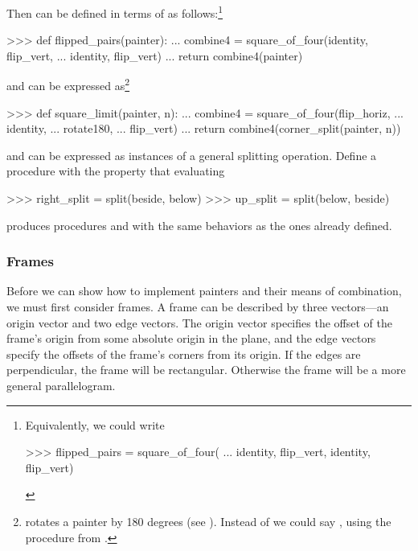 \noindent
Then  can be defined in terms of 
as follows:\footnote{Equivalently, we could write

\begin{compactCodeBlock}
>>> flipped_pairs = square_of_four(
...     identity, flip_vert, identity, flip_vert)
\end{compactCodeBlock}
}

\begin{codeBlock}
>>> def flipped_pairs(painter):
...     combine4 = square_of_four(identity, flip_vert,
...                               identity, flip_vert)
...     return combine4(painter)
\end{codeBlock}

\noindent
and  can be expressed as\footnote{ rotates
a painter by 180 degrees (see ).  Instead of
 we could say , using
the  procedure from .}

\begin{codeBlock}
>>> def square_limit(painter, n):
...     combine4 = square_of_four(flip_horiz,
...                               identity,
...                               rotate180,
...                               flip_vert)
...     return combine4(corner_split(painter, n))
\end{codeBlock}

\begin{exerciseGroup}
\label{Exercise 2.45}
  and
 can be expressed as instances of a general splitting
operation.
Define a procedure  with the property that evaluating

\begin{codeBlock}
>>> right_split = split(beside, below)
>>> up_split = split(below, beside)
\end{codeBlock}

\noindent
produces procedures  and  with the same
behaviors as the ones already defined.
\end{exerciseGroup}

\subsubsection*{Frames}

Before we can show how to implement painters and their means of combination, we
must first consider frames.  A frame can be described by three vectors---an
origin vector and two edge vectors.  The origin vector specifies the offset of
the frame's origin from some absolute origin in the plane, and the edge vectors
specify the offsets of the frame's corners from its origin.  If the edges are
perpendicular, the frame will be rectangular.  Otherwise the frame will be a
more general parallelogram.

